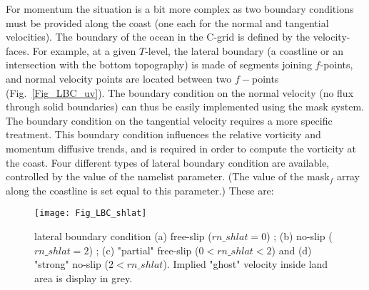 \documentclass[NEMO_book]{subfiles}
\begin{document}
For momentum the situation is a bit more complex as two boundary conditions 
must be provided along the coast (one each for the normal and tangential velocities). 
The boundary of the ocean in the C-grid is defined by the velocity-faces. 
For example, at a given $T$-level, the lateral boundary (a coastline or an intersection 
with the bottom topography) is made of segments joining $f$-points, and normal 
velocity points are located between two $f-$points (Fig.~\ref{Fig_LBC_uv}). 
The boundary condition on the normal velocity (no flux through solid boundaries) 
can thus be easily implemented using the mask system. The boundary condition 
on the tangential velocity requires a more specific treatment. This boundary 
condition influences the relative vorticity and momentum diffusive trends, and is 
required in order to compute the vorticity at the coast. Four different types of 
lateral boundary condition are available, controlled by the value of the  
namelist parameter. (The value of the mask$_{f}$ array along the coastline is set 
equal to this parameter.) These are:

\begin{figure}[!p] \begin{center}
\texttt{[image: Fig\_LBC\_shlat]}
\caption{     \label{Fig_LBC_shlat} 
lateral boundary condition (a) free-slip ($rn\_shlat=0$) ; (b) no-slip ($rn\_shlat=2$) 
; (c) "partial" free-slip ($0<rn\_shlat<2$) and (d) "strong" no-slip ($2<rn\_shlat$). 
Implied "ghost" velocity inside land area is display in grey. }
\end{center}    \end{figure}
\end{document}
